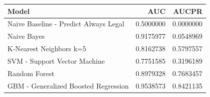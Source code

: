 \documentclass[]{article}
\begin{document}
\begin{table}[H]
\centering\begingroup\fontsize{10}{12}\selectfont

\begin{tabular}{l|r|r}
\hline
Model & AUC & AUCPR\\
\hline
Naive Baseline - Predict Always Legal & 0.5000000 & 0.0000000\\
\hline
Naive Bayes & 0.9175977 & 0.0548969\\
\hline
K-Nearest Neighbors k=5 & 0.8162738 & 0.5797557\\
\hline
SVM - Support Vector Machine & 0.7751585 & 0.3196189\\
\hline
Random Forest & 0.8979328 & 0.7683457\\
\hline
GBM - Generalized Boosted Regression & 0.9538573 & 0.8421135\\
\hline
\end{tabular}
\endgroup{}
\end{table}
\end{document}
